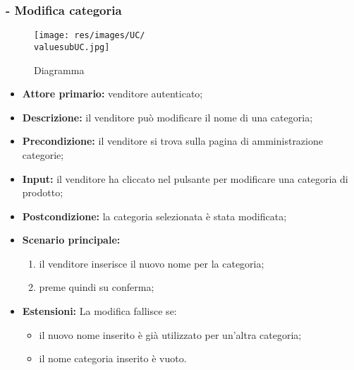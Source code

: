 \subsubsection{- Modifica categoria}
\begin{figure}[H]
    \centering
    \texttt{[image: res/images/UC/\\valuesubUC.jpg]}
    \caption{Diagramma }
\end{figure}
\begin{itemize}
    \item \textbf{Attore primario:} venditore autenticato;
    \item \textbf{Descrizione:} il venditore può modificare il nome di una categoria;
    \item \textbf{Precondizione:} il venditore si trova sulla pagina di amministrazione categorie;
    \item \textbf{Input:} il venditore ha cliccato nel pulsante per modificare una categoria di prodotto;
    \item \textbf{Postcondizione:} la categoria selezionata è stata modificata;
    \item \textbf{Scenario principale:}
          \begin{enumerate}
              \item il venditore inserisce il nuovo nome per la categoria;
              \item preme quindi su conferma;
          \end{enumerate}
    \item \textbf{Estensioni:} La modifica fallisce se:
          \begin{itemize}
              \item il nuovo nome inserito è già utilizzato per un'altra categoria;
              \item il nome categoria inserito è vuoto.
          \end{itemize}
\end{itemize}

\stepsubUserCase
